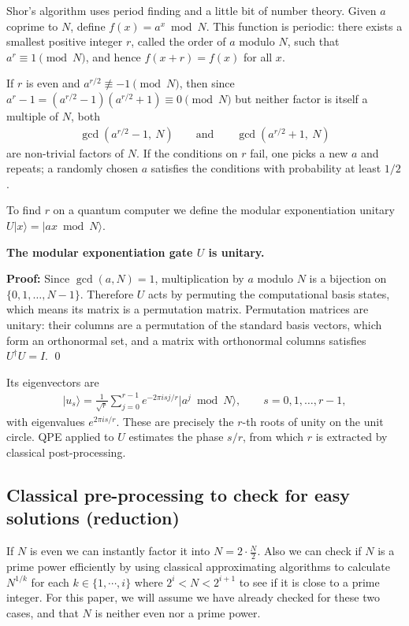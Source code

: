 \documentclass[11pt]{article}
\begin{document}
Shor's algorithm uses period finding and a little bit of number theory. Given $a$ coprime to $N$, define $f(x) = a^x \bmod N$. This function is periodic: there exists a smallest positive integer $r$, called the order of $a$ modulo $N$, such that $a^r \equiv 1 \pmod{N}$, and hence $f(x + r) = f(x)$ for all $x$.

If $r$ is even and $a^{r/2} \not\equiv -1 \pmod{N}$, then since $a^r - 1 = (a^{r/2}-1)(a^{r/2}+1) \equiv 0 \pmod{N}$ but neither factor is itself a multiple of $N$, both
\begin{align*}
\gcd(a^{r/2} - 1,\ N) \qquad \text{and} \qquad \gcd(a^{r/2} + 1,\ N)
\end{align*}
are non-trivial factors of $N$. If the conditions on $r$ fail, one picks a new $a$ and repeats; a randomly chosen $a$ satisfies the conditions with probability at least $1/2$.

To find $r$ on a quantum computer we define the modular exponentiation unitary $U\vert x \rangle = \vert ax \bmod N \rangle$.

\textbf{The modular exponentiation gate $U$ is unitary.}

\textbf{Proof:} Since $\gcd(a, N) = 1$, multiplication by $a$ modulo $N$ is a bijection on $\{0, 1, \ldots, N-1\}$. Therefore $U$ acts by permuting the computational basis states, which means its matrix is a permutation matrix. Permutation matrices are unitary: their columns are a permutation of the standard basis vectors, which form an orthonormal set, and a matrix with orthonormal columns satisfies $U^\dagger U = I$. \qed

Its eigenvectors are
\begin{align*}
\vert u_s \rangle = \frac{1}{\sqrt{r}}\sum_{j=0}^{r-1} e^{-2\pi i sj/r}\vert a^j \bmod N \rangle, \qquad s = 0, 1, \ldots, r-1,
\end{align*}
with eigenvalues $e^{2\pi i s/r}$. These are precisely the $r$-th roots of unity on the unit circle. QPE applied to $U$ estimates the phase $s/r$, from which $r$ is extracted by classical post-processing.

\subsection{Classical pre-processing to check for easy solutions (reduction)}

If $N$ is even we can instantly factor it into $N = 2 \cdot \frac{N}{2}$. Also we can check if $N$ is a prime power efficiently by using classical approximating algorithms to calculate $N^{1/k}$ for each $k \in \{1, \cdots, i\}$ where $2^i < N < 2^{i+1}$ to see if it is close to a prime integer. For this paper, we will assume we have already checked for these two cases, and that $N$ is neither even nor a prime power.
\end{document}
